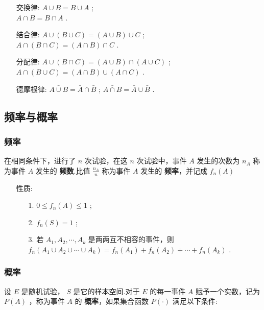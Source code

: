 \documentclass[UTF8]{ctexart}
\begin{document}
	\begin{itemize}
		\item [交换律:] { $ A \cup B=B \cup A $ ; \\ $  A \cap B=B \cap A  $ .}
		\item [结合律:] { $ A \cup (B \cup C)=(A \cup B) \cup C $ ; \\ $  A \cap (B \cap C)=(A \cap B) \cap C $ .}
		\item [分配律:] { $ A \cup (B \cap C)=(A \cup B) \cap (A \cup C) $ ; \\ $ A \cap (B \cup C)=(A \cap B) \cup (A \cap C) $ .}
		\item [德摩根律:] { $ \bar{A \cup B} = \bar{A} \cap \bar{B} $ ; $ \bar{A \cap B} = \bar{A} \cup \bar{B} $ .}
	\end{itemize}
	
	\subsection{频率与概率}
	
	\subsubsection{频率}
	
	{在相同条件下，进行了 $ n $ 次试验，在这 $ n $ 次试验中，事件 $ A $ 发生的次数为 $ n_{A} $ 称为事件 $ A $ 发生的 \textbf{频数}.比值 $ \frac{n_{A}}{n} $ 称为事件 $ A $ 发生的 \textbf{频率}，并记成 $ f_{n}(A) $ }
	
	\begin{itemize}
		\item [性质:] {
			\begin{enumerate}
				\item [1.] { $ 0 \le f_{n}(A) \le 1 $ ;}
				\item [2.] { $ f_{n}(S)=1 $ ;}
				\item [3.] { 若 $A_{1},A_{2}, \cdots ,A_{k} $ 是两两互不相容的事件，则 $ f_{n}(A_{1} \cup A_{2} \cup \cdots \cup A_{k})=f_{n}(A_{1})+f_{n}(A_{2})+ \cdots +f_{n}(A_{k}) $ .}
			\end{enumerate}
		}
	\end{itemize}

	\subsubsection{概率}
	
	{设 $ E $ 是随机试验， $ S $ 是它的样本空间.对于 $ E $ 的每一事件 $ A $ 赋予一个实数，记为 $ P(A) $ ，称为事件 $ A $ 的 \textbf{概率}，如果集合函数 $ P( \cdot ) $ 满足以下条件:}
	
\end{document}
